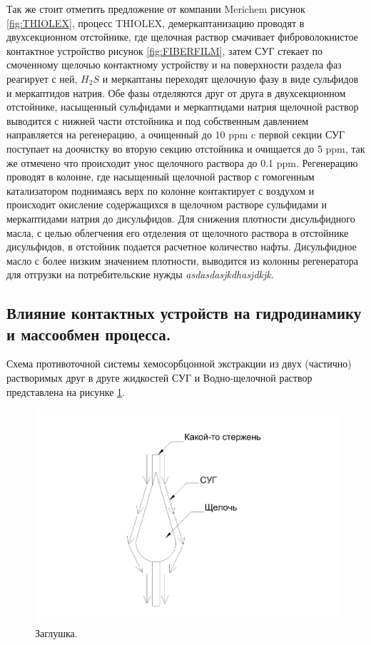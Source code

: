 Так же стоит отметить предложение от компании Merichem рисунок \cref{fig:THIOLEX}, 
процесс THIOLEX, демеркаптанизацию проводят в двухсекционном отстойнике, где щелочная раствор смачивает фиброволокнистое контактное устройство рисунок \cref{fig:FIBERFILM}, затем СУГ стекает по смоченному щелочью контактному устройству и на поверхности раздела фаз реагирует с ней, $H_2S$ и меркаптаны переходят щелочную фазу в виде сульфидов и меркаптидов натрия. Обе фазы отделяются друг от друга в двухсекционном отстойнике, насыщенный сульфидами и меркаптидами натрия щелочной раствор выводится с нижней части отстойника и под собственным давлением направляется на регенерацию, а очищенный до \num{10} ppm c первой секции СУГ поступает на доочистку во вторую секцию отстойника и очищается до \num{5} ppm, так же отмечено что происходит унос щелочного раствора до \num{0,1} ppm. Регенерацию проводят в колонне, где насыщенный щелочной раствор с гомогенным катализатором поднимаясь верх по колонне контактирует с воздухом и происходит окисление содержащихся в щелочном растворе сульфидами и меркаптидами натрия до дисульфидов. Для снижения плотности дисульфидного масла, с целью облегчения его отделения от щелочного раствора в отстойнике дисульфидов, в отстойник подается расчетное количество нафты. Дисульфидное масло с более низким значением плотности, выводится из колонны регенератора для отгрузки на потребительские нужды \textit{asdasdasjkdhasjdkjk}.

\subsection{Влияние контактных устройств на гидродинамику и массообмен процесса.} \label{sec:ch1/sec3}

Схема противоточной системы хемосорбцонной экстракции из двух (частично) растворимых друг в друге жидкостей СУГ и Водно-щелочной раствор представлена на рисунке \cref{fig:cheme}.

\begin{figure}
	\centering
	\includegraphics[width=0.6\linewidth]{images/fibr}
	\caption{Заглушка.}
	\label{fig:cheme}
\end{figure}

